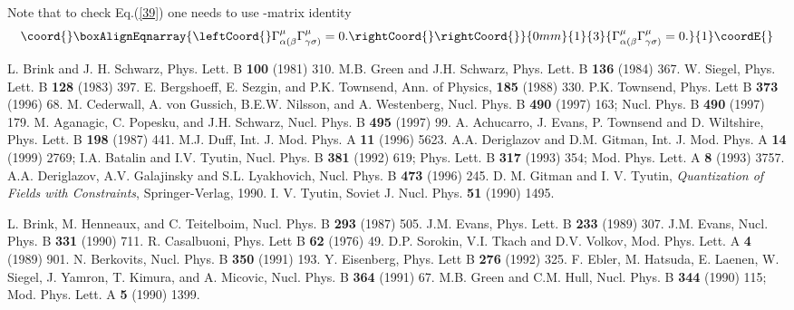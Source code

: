 \documentclass[a4paper]{article}
\begin{document}
Note that to check Eq.(\ref{39}) one needs to use \coordHE{}  \myHighlight{$\Gamma$}\coordHE{}-matrix 
identity 
\begin{eqnarray}\coord{}\boxAlignEqnarray{\leftCoord{}
\Gamma^\mu_{\alpha(\beta}\Gamma^\mu_{\gamma\sigma)}=0.\rightCoord{}
\rightCoord{}}{0mm}{1}{3}{
\Gamma^\mu_{\alpha(\beta}\Gamma^\mu_{\gamma\sigma)}=0.
}{1}\coordE{}\end{eqnarray}
  
\begin{thebibliography}{nn}
\bibitem{} L. Brink and J. H. Schwarz, Phys. Lett. B {\bf 100}
(1981) 310.
\bibitem{} M.B. Green and J.H. Schwarz, Phys. Lett. B {\bf 136}
(1984) 367.
\bibitem{} W. Siegel, Phys. Lett. B {\bf 128} (1983) 397.
\bibitem{} E. Bergshoeff, E. Sezgin, and P.K. Townsend, Ann. of Physics,
{\bf 185} (1988) 330.
\bibitem{} P.K. Townsend, Phys. Lett B {\bf 373} (1996) 68.
\bibitem{} M. Cederwall, A. von Gussich, B.E.W. Nilsson, and A.
Westenberg, Nucl. Phys. B {\bf 490} (1997) 163; Nucl. Phys. B {\bf 490}
(1997) 179.
\bibitem{} M. Aganagic, C. Popesku, and J.H. Schwarz, Nucl. Phys.
B {\bf 495} (1997) 99.
\bibitem{} A. Achucarro, J. Evans, P. Townsend and D. Wiltshire,
Phys. Lett. B {\bf 198} (1987) 441.
\bibitem{} M.J. Duff, Int. J. Mod. Phys. A {\bf 11} (1996) 5623.
\bibitem{} A.A. Deriglazov and D.M. Gitman, Int. J. Mod. Phys. A 
{\bf 14} (1999) 2769;
\bibitem{} I.A. Batalin and I.V. Tyutin, Nucl. Phys. B {\bf 381} (1992)
619; Phys. Lett. B {\bf 317} (1993) 354; Mod. Phys. Lett. A {\bf 8}
(1993) 3757.
\bibitem{} A.A. Deriglazov, A.V. Galajinsky and 
S.L. Lyakhovich, Nucl. Phys. B {\bf 473} (1996) 245. 
\bibitem{} D. M. Gitman and I. V. Tyutin, {\em Quantization of Fields
with Constraints}, Springer-Verlag, 1990.
\bibitem{} I. V. Tyutin, Soviet J. Nucl. Phys. {\bf 51} (1990) 1495. 
\item{} L. Brink, M. Henneaux, and C. Teitelboim, Nucl. Phys. B {\bf
293} (1987) 505.
\bibitem{} J.M. Evans, Phys. Lett. B {\bf 233} (1989) 307.
\bibitem{} J.M. Evans, Nucl. Phys. B {\bf 331} (1990) 711.
\bibitem{} R. Casalbuoni, Phys. Lett B {\bf 62} (1976) 49.
\bibitem{} D.P. Sorokin, V.I. Tkach and D.V. Volkov, Mod. Phys. Lett. 
A {\bf 4} (1989) 901.
\bibitem{} N. Berkovits, Nucl. Phys. B {\bf 350} (1991) 193.
 Y. Eisenberg, Phys. Lett B {\bf 276} (1992) 325.
\bibitem{} F. Ebler, M. Hatsuda, E. Laenen, W. Siegel, J. Yamron, T.
Kimura, and A. Micovic, Nucl. Phys. B {\bf 364} (1991) 67.
\bibitem{} M.B. Green and C.M. Hull, Nucl. Phys. B {\bf 344} (1990) 115;
Mod. Phys. Lett. A {\bf 5} (1990) 1399.

\end{thebibliography}
\end{document}
